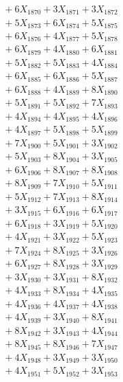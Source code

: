 \documentclass[a4paper,10pt]{article}
\begin{document}
{\begin{align}
&\;  + 6 X_{1870} + 3 X_{1871} + 3 X_{1872} \\[0.3ex]
&\;  + 5 X_{1873} + 6 X_{1874} + 5 X_{1875} \\[0.3ex]
&\;  + 6 X_{1876} + 4 X_{1877} + 5 X_{1878} \\[0.3ex]
&\;  + 6 X_{1879} + 4 X_{1880} + 6 X_{1881} \\[0.3ex]
&\;  + 5 X_{1882} + 5 X_{1883} + 4 X_{1884} \\[0.3ex]
&\;  + 6 X_{1885} + 6 X_{1886} + 5 X_{1887} \\[0.3ex]
&\;  + 6 X_{1888} + 4 X_{1889} + 8 X_{1890} \\[0.3ex]
&\;  + 5 X_{1891} + 5 X_{1892} + 7 X_{1893} \\[0.3ex]
&\;  + 4 X_{1894} + 4 X_{1895} + 4 X_{1896} \\[0.3ex]
&\;  + 4 X_{1897} + 5 X_{1898} + 5 X_{1899} \\[0.5ex]\allowbreak
&\;  + 7 X_{1900} + 5 X_{1901} + 3 X_{1902} \\[0.3ex]
&\;  + 5 X_{1903} + 8 X_{1904} + 3 X_{1905} \\[0.3ex]
&\;  + 6 X_{1906} + 8 X_{1907} + 8 X_{1908} \\[0.3ex]
&\;  + 8 X_{1909} + 7 X_{1910} + 5 X_{1911} \\[0.3ex]
&\;  + 5 X_{1912} + 7 X_{1913} + 8 X_{1914} \\[0.3ex]
&\;  + 3 X_{1915} + 6 X_{1916} + 6 X_{1917} \\[0.3ex]
&\;  + 6 X_{1918} + 3 X_{1919} + 5 X_{1920} \\[0.3ex]
&\;  + 4 X_{1921} + 3 X_{1922} + 5 X_{1923} \\[0.3ex]
&\;  + 7 X_{1924} + 8 X_{1925} + 3 X_{1926} \\[0.3ex]
&\;  + 6 X_{1927} + 8 X_{1928} + 3 X_{1929} \\[0.5ex]\allowbreak
&\;  + 3 X_{1930} + 3 X_{1931} + 8 X_{1932} \\[0.3ex]
&\;  + 4 X_{1933} + 8 X_{1934} + 4 X_{1935} \\[0.3ex]
&\;  + 4 X_{1936} + 4 X_{1937} + 4 X_{1938} \\[0.3ex]
&\;  + 4 X_{1939} + 3 X_{1940} + 8 X_{1941} \\[0.3ex]
&\;  + 8 X_{1942} + 3 X_{1943} + 4 X_{1944} \\[0.3ex]
&\;  + 8 X_{1945} + 8 X_{1946} + 7 X_{1947} \\[0.3ex]
&\;  + 4 X_{1948} + 3 X_{1949} + 3 X_{1950} \\[0.3ex]
&\;  + 4 X_{1951} + 5 X_{1952} + 3 X_{1953} \\[0.3ex]

\end{align}}
\end{document}
